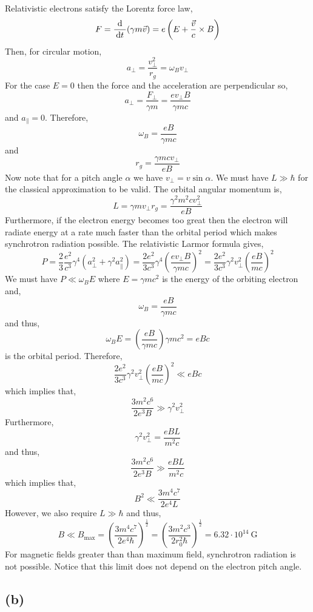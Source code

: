 \documentclass[12pt]{article}
\begin{document}
Relativistic electrons satisfy the Lorentz force law,
\[ F = \frac{\: \mathrm{d} \:}{\: \mathrm{d}t \:} (\gamma m \vec{v}) = e \left( E + \frac{\vec{v}}{c} \times B \right) \]
Then, for circular motion,
\[ a_\perp = \frac{v_\perp^2}{r_g} = \omega_B v_\perp \]
For the case $E = 0$ then the force and the acceleration are perpendicular so,
\[ a_\perp = \frac{F_\perp}{\gamma m} = \frac{e v_\perp B}{\gamma m c} \]
and $a_\parallel = 0$. Therefore, 
\[ \omega_B = \frac{e B}{\gamma m c} \]
and 
\[ r_g = \frac{\gamma m c v_\perp}{e B} \] 
Now note that for a pitch angle $\alpha$ we have $v_\perp = v \sin{\alpha}$. We must have $L \gg \hbar$ for the classical approximation to be valid. The orbital angular momentum is,
\[ L = \gamma m v_\perp r_g = \frac{\gamma^2 m^2 c v_\perp^2}{e B}  \] 
Furthermore, if the electron energy becomes too great then the electron will radiate energy at a rate much faster than the orbital period which makes synchrotron radiation possible. The relativistic Larmor formula gives, 
\[ P = \frac{2}{3} \frac{e^2}{c^3} \gamma^4 ( a_\perp^2 + \gamma^2 a_{\parallel}^2) = \frac{2 e^2}{3 c^3} \gamma^4 \left( \frac{e v_\perp B}{\gamma m c} \right)^2 = \frac{2 e^2}{3 c^3} \gamma^2 v_\perp^2 \left( \frac{e B}{m c} \right)^2 \]
We must have $P \ll \omega_B E$ where $E = \gamma m c^2$ is the energy of the orbiting electron and,
\[ \omega_B = \frac{e B}{\gamma m c} \] 
and thus,
\[ \omega_B E = \left( \frac{e B}{\gamma m c} \right) \gamma m c^2 = e B c \]
is the orbital period. Therefore,
\[ \frac{2 e^2}{3 c^3} \gamma^2 v_\perp^2 \left( \frac{e B}{m c} \right)^2 \ll e B c \]
which implies that,
\[ \frac{3 m^2 c^6}{2 e^3 B} \gg \gamma^2 v_\perp^2 \]
Furthermore, 
\[ \gamma^2 v_\perp^2 = \frac{e B L}{m^2 c} \]
and thus,
\[ \frac{3 m^2 c^6}{2 e^3 B} \gg \frac{e B L}{m^2 c} \]
which implies that,
\[ B^2 \ll \frac{3 m^4 c^7}{2 e^4 L} \]
However, we also require $L \gg \hbar$ and thus,
\[ B \ll B_{\text{max}} = \left( \frac{3 m^4 c^7}{2 e^4 \hbar} \right)^{\frac{1}{2}} = \left( \frac{3 m^2 c^3}{2 r_0^2 \hbar} \right)^{\frac{1}{2}} = 6.32 \cdot 10^{14} \: \mathrm{G} \]
For magnetic fields greater than than maximum field, synchrotron radiation is not possible. Notice that this limit does not depend on the electron pitch angle.

\subsection*{(b)}
\end{document}
